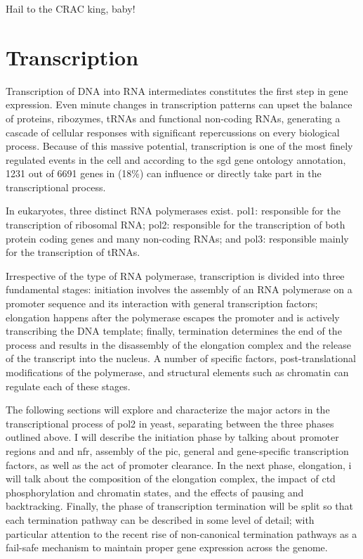 \begin{savequote}[70mm]
Hail to the CRAC king, baby!
\end{savequote}

\chapter{Transcription}

Transcription of DNA into RNA intermediates constitutes the first step in gene expression.
Even minute changes in transcription patterns can upset the balance of proteins, ribozymes, tRNAs and functional non-coding RNAs, generating a cascade of cellular responses with  significant repercussions on every biological process.
Because of this massive potential, transcription is one of the most finely regulated events in the cell and according to the \gls{sgd} \cite{cherry:2012:saccharomyces} gene ontology annotation, 1231 out of 6691 genes in \cer{} (18\%) can influence or directly take part in the transcriptional process.

In eukaryotes, three distinct RNA polymerases exist. \gls{pol1}: responsible for the transcription of ribosomal RNA; \gls{pol2}: responsible for the transcription of both protein coding genes and many non-coding RNAs; and \gls{pol3}: responsible mainly for the transcription of tRNAs. 

Irrespective of the type of RNA polymerase, transcription is divided into three fundamental stages: initiation involves the assembly of an RNA polymerase on a promoter sequence and its interaction with general transcription factors; elongation happens after the polymerase escapes the promoter and is actively transcribing the DNA template; finally, termination determines the end of the process and results in the disassembly of the elongation complex and the release of the transcript into the nucleus. 
A number of specific factors, post-translational modifications of the polymerase, and structural elements such as chromatin can regulate each of these stages.

The following sections will explore and characterize the major actors in the transcriptional process of \gls{pol2} in yeast, separating between the three phases outlined above.
I will describe the initiation phase by talking about promoter regions and and \gls{nfr}, assembly of the \gls{pic}, general and gene-specific transcription factors, as well as the act of promoter clearance.
In the next phase, elongation, i will talk about the composition of the elongation complex, the impact of \gls{ctd} phosphorylation and chromatin states, and the effects of pausing and backtracking.
Finally, the phase of transcription termination will be split so that each termination pathway can be described in some level of detail; with particular attention to the recent rise of non-canonical termination pathways as a fail-safe mechanism to maintain proper gene expression across the genome.   

